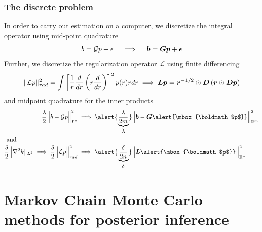 \documentclass[]{beamer}
\newcommand{\R}{\ensuremath{\mathbb R}}  %
\newcommand{\ds}{\displaystyle}
\newcommand{\G}{\ensuremath{\mathcal G}}
\newcommand{\LL}{\ensuremath{\mathcal L}}
\newcommand{\bm}[1]{\mbox{\boldmath$#1$}}
\newcommand{\vect}[1]{\bm{#1}}
\begin{document}
\begin{frame}
  \frametitle{The discrete problem}
  {\footnotesize 
  In order to carry out estimation on a computer, we discretize the integral operator using \alert{mid-point quadrature}}
  $$
    b = \mathcal G p + \epsilon\quad \implies \quad \vect b = \vect G \vect p + \vect\epsilon
  $$
  {\footnotesize  Further, we discretize the regularization operator $\LL$ using \alert{finite differencing} }
    $$ 
      \ds{\|\LL p\|_{rad}^2 = \int \left[\frac1r \frac{d}{dr} \left(r \frac d{dr} \right)\right]^2 p(r) rdr}
      \implies 
      \vect L \vect p = \vect r^{-1/2} \odot \vect D \left(\vect r \odot \vect D\vect p\right) 
    $$
    {\footnotesize and \alert{midpoint quadrature} for the inner products
    \begin{align*}
      \frac \lambda {2} \Big\|b - \G p\Big\|_{L^2}^2 &\implies \alert{\underbrace{\frac \lambda {2m}}_{\ds{\lambda}}} \Big\|\vect b - \vect G \alert{\vect p}\Big\|_{\R^m}^2 \\ 
      \intertext{ and }
      \frac\delta2 \Big\|\nabla^2 k\|_{L^2} \implies \frac \delta {2} \Big\|\LL p\Big\|_{rad}^2  &\implies \alert{\underbrace{\frac \delta {2n}}_{\ds{\delta}}} \Big\|\vect L  \alert{\vect p}\Big\|_{\R^n}^2  
    \end{align*}
    }
\end{frame}

\section{Markov Chain Monte Carlo methods for posterior inference}
\end{document}

